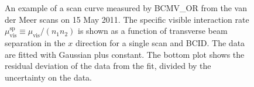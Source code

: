 \begin{figure}[htbp]
	\centering
	\caption{An example of a scan curve measured by BCMV\_OR from the van der Meer scans on 15 May 2011. The specific visible interaction rate $\mu_{\mathrm{vis}}^{\mathrm{sp}}\equiv \mu_{\mathrm{vis}}/(n_1n_2)$ is shown as a function of transverse beam separation in the $x$ direction for a single scan and BCID. The data are fitted with Gaussian plus constant. The bottom plot shows the residual deviation of the data from the fit, divided by the uncertainty on the data.}
	\label{fig:vdm-curve}
\end{figure}

